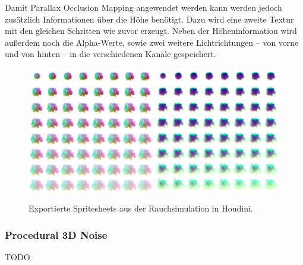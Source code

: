 Damit Parallax Occlusion Mapping angewendet werden kann werden jedoch zusätzlich Informationen über die Höhe benötigt.
Dazu wird eine zweite Textur mit den gleichen Schritten wie zuvor erzeugt. Neben der Höheninformation wird außerdem noch die Alpha-Werte, sowie zwei weitere Lichtrichtungen –
von vorne und von hinten – in die verschiedenen Kanäle gespeichert.




\begin{figure}[h!]
	\centering
	\includegraphics[width=0.49\textwidth]{Grafiken/Implementation/Explo_T1_8x8.png}
	\includegraphics[width=0.49\textwidth]{Grafiken/Implementation/Explo_T2_8x8.png}
	\begin{footnotesize}
		\caption{Exportierte Spritesheets aus der Rauchsimulation in Houdini. }
		\label{fig:flipbook}
	\end{footnotesize}
\end{figure}


\subsubsection{Procedural 3D Noise}
TODO







